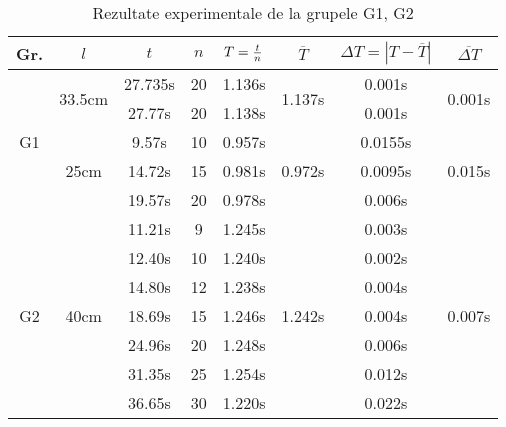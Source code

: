 \documentclass{article}
\begin{document}
\renewcommand{\arraystretch}{1.25}
\begin{table}
\centering
\begin{tabular}{| c | c | c | c | c | c | c | c |}
	\hline
	Gr. & $l$ & $t$ & $n$ & $T={t \over n}$ & $\overline{T}$ & $\Delta T =|T - \overline{T}|$ & $\overline{\Delta T}$ \\
	\hline
	\multicolumn{1}{|c|}{\multirow{5}{*}{G1}} & \multirow{2}{*}{33.5cm} & 27.735s & 20 & 1.136s & \multirow{2}{*}{1.137s} & 0.001s & \multirow{2}{*}{0.001s} \\
	\multicolumn{1}{|c|}{}                    &                         & 27.77s  & 20 & 1.138s &                         & 0.001s & \multicolumn{1}{|c|}{} \\
	\cline{2-8}
        \multicolumn{1}{|c|}{}			  & \multirow{3}{*}{25cm}   & 9.57s   & 10 & 0.957s & \multirow{3}{*}{0.972s} & 0.0155s & \multirow{3}{*}{0.015s} \\
	\multicolumn{1}{|c|}{}                    &                         & 14.72s  & 15 & 0.981s &                         & 0.0095s & \multicolumn{1}{|c|}{} \\
	\multicolumn{1}{|c|}{}	                  &                         & 19.57s  & 20 & 0.978s  &                         & 0.006s & \multicolumn{1}{|c|}{} \\
	\hline
	\multicolumn{1}{|c|}{\multirow{7}{*}{G2}} & \multirow{7}{*}{40cm}   & 11.21s &  9 & 1.245s & \multirow{7}{*}{1.242s} & 0.003s & \multirow{7}{*}{0.007s} \\
	\multicolumn{1}{|c|}{}                    &                         & 12.40s & 10 & 1.240s &                         & 0.002s & \multicolumn{1}{|c|}{} \\
	\multicolumn{1}{|c|}{}			  &                         & 14.80s & 12 & 1.238s &                         & 0.004s & \multicolumn{1}{|c|}{} \\
	\multicolumn{1}{|c|}{}                    &                         & 18.69s & 15 & 1.246s &                         & 0.004s & \multicolumn{1}{|c|}{} \\
	\multicolumn{1}{|c|}{}	                  &                         & 24.96s & 20 & 1.248s &                         & 0.006s & \multicolumn{1}{|c|}{} \\
	\multicolumn{1}{|c|}{}	                  &                         & 31.35s & 25 & 1.254s &                         & 0.012s & \multicolumn{1}{|c|}{} \\
	\multicolumn{1}{|c|}{}	                  &                         & 36.65s & 30 & 1.220s &                         & 0.022s & \multicolumn{1}{|c|}{} \\
	\hline
\end{tabular}

\caption{Rezultate experimentale de la grupele G1, G2}
\label{table:dateexp}
\end{table}
\end{document}
